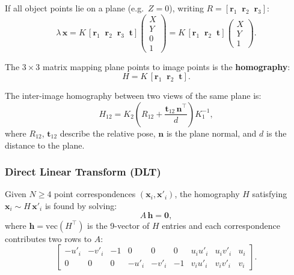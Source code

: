 \documentclass[12pt, a4paper]{article}
\begin{document}
If all object points lie on a plane (e.g.\ $Z=0$), writing $R = [\mathbf{r}_1\;\;\mathbf{r}_2\;\;\mathbf{r}_3]$:
\begin{equation}
  \lambda\,\mathbf{x} = K\,[\mathbf{r}_1\;\;\mathbf{r}_2\;\;\mathbf{r}_3\;\;\mathbf{t}]
  \begin{pmatrix}X\\Y\\0\\1\end{pmatrix}
  = K\,[\mathbf{r}_1\;\;\mathbf{r}_2\;\;\mathbf{t}]
  \begin{pmatrix}X\\Y\\1\end{pmatrix}.
\end{equation}

The $3\times3$ matrix mapping plane points to image points is the \textbf{homography}:
\begin{equation}
  H = K\,[\mathbf{r}_1\;\;\mathbf{r}_2\;\;\mathbf{t}].
  \label{eq:H_def}
\end{equation}

The inter-image homography between two views of the same plane is:
\begin{equation}
  H_{12} = K_2\left(R_{12} + \frac{\mathbf{t}_{12}\,\mathbf{n}^\top}{d}\right)K_1^{-1},
  \label{eq:H_inter}
\end{equation}
where $R_{12}$, $\mathbf{t}_{12}$ describe the relative pose, $\mathbf{n}$ is the plane normal, and $d$ is the distance to the plane.


\subsubsection{Direct Linear Transform (DLT)}

Given $N \geq 4$ point correspondences $(\mathbf{x}_i, \mathbf{x}'_i)$, the homography $H$ satisfying $\mathbf{x}_i \sim H\,\mathbf{x}'_i$ is found by solving:
\begin{equation}
  A\,\mathbf{h} = \mathbf{0},
\end{equation}
where $\mathbf{h} = \mathrm{vec}(H^\top)$ is the 9-vector of $H$ entries and each correspondence contributes two rows to $A$:
\[
  \begin{bmatrix}
    -u'_i & -v'_i & -1 & 0 & 0 & 0 & u_i u'_i & u_i v'_i & u_i\\
    0 & 0 & 0 & -u'_i & -v'_i & -1 & v_i u'_i & v_i v'_i & v_i
  \end{bmatrix}.
\]
\end{document}
